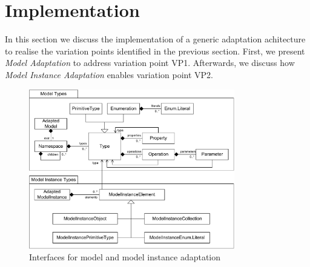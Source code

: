 \section{Implementation}
\label{sec:implementation}
	In this section we discuss the implementation of a generic adaptation
	achitecture to realise the
	variation points identified in the previous section. First, we present
	\emph{Model Adaptation} to address variation point VP1. Afterwards, we discuss how \emph{Model
	Instance Adaptation} enables variation point VP2.
	
	\begin{figure}[p]
			\centering
				\includegraphics[width=0.80\textwidth]{figures/coreconcepts.pdf}
			\caption{
			Interfaces for model and model instance adaptation
			}
			\label{fig:coreconcepts}
			
			\vspace{4.0em}
			

\end{figure}
